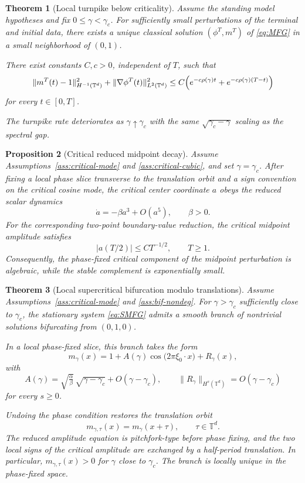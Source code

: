 \documentclass[11pt]{amsart}
\newtheorem{theorem}{Theorem}[section]
\newtheorem{proposition}[theorem]{Proposition}
\theoremstyle{definition}
\theoremstyle{remark}
\newcommand{\Td}{\mathbb{T}^d}
\newcommand{\phiT}{\phi^T}
\newcommand{\mT}{m^T}
\newcommand{\gamc}{\gamma_c}
\newcommand{\grad}{\nabla}
\begin{document}
\begin{theorem}[Local turnpike below criticality]
\label{thm:subcritical}
Assume the standing model hypotheses and fix $0\le \gamma<\gamc$. For sufficiently small perturbations of the terminal and initial data, there exists a unique classical solution $(\phiT,\mT)$ of \eqref{eq:MFG} in a small neighborhood of $(0,1)$.

There exist constants $C,c>0$, independent of $T$, such that
\begin{equation}
\label{eq:tp-sub}
\|\mT(t)-1\|_{H^{-1}(\Td)}^2+\|\grad \phiT(t)\|_{L^2(\Td)}^2
\le C\Bigl(e^{-c\rho(\gamma)t}+e^{-c\rho(\gamma)(T-t)}\Bigr)
\end{equation}
for every $t\in[0,T]$.

The turnpike rate deteriorates as $\gamma\uparrow\gamc$ with the same $\sqrt{\gamc-\gamma}$ scaling as the spectral gap.
\end{theorem}

\begin{proposition}[Critical reduced midpoint decay]
\label{prop:critical}
Assume Assumptions~\ref{ass:critical-mode} and \ref{ass:critical-cubic}, and set $\gamma=\gamc$. After fixing a local phase slice transverse to the translation orbit and a sign convention on the critical cosine mode, the critical center coordinate $a$ obeys the reduced scalar dynamics
\[
\dot a = -\beta a^3 + O(a^5), \qquad \beta>0.
\]
For the corresponding two-point boundary-value reduction, the critical midpoint amplitude satisfies
\[
|a(T/2)|\le C T^{-1/2}, \qquad T\ge 1.
\]
Consequently, the phase-fixed critical component of the midpoint perturbation is algebraic, while the stable complement is exponentially small.
\end{proposition}

\begin{theorem}[Local supercritical bifurcation modulo translations]
\label{thm:bifurcation}
Assume Assumptions~\ref{ass:critical-mode} and \ref{ass:bif-nondeg}. For $\gamma>\gamc$
sufficiently close to $\gamc$, the stationary system \eqref{eq:SMFG} admits a smooth branch of nontrivial solutions bifurcating from $(0,1,0)$.

In a local phase-fixed slice, this branch takes the form
\[
m_\gamma(x)=1+A(\gamma)\cos\!\bigl(2\pi \xi_0\cdot x\bigr)+R_\gamma(x),
\]
with
\[
A(\gamma) = \sqrt{\tfrac{\alpha}{\beta}}\,\sqrt{\gamma-\gamc}+O(\gamma-\gamc),
\qquad
\|R_\gamma\|_{H^s(\Td)}=O(\gamma-\gamc)
\]
for every $s\ge 0$.

Undoing the phase condition restores the translation orbit
\[
m_{\gamma,\tau}(x)=m_\gamma(x+\tau),\qquad \tau\in \Td.
\]
The reduced amplitude equation is pitchfork-type before phase fixing, and the two local signs of the critical amplitude are exchanged by a half-period translation. In particular,
$m_{\gamma,\tau}(x)>0$ for $\gamma$ close to $\gamc$. The branch is locally unique in the phase-fixed space.
\end{theorem}
\end{document}

